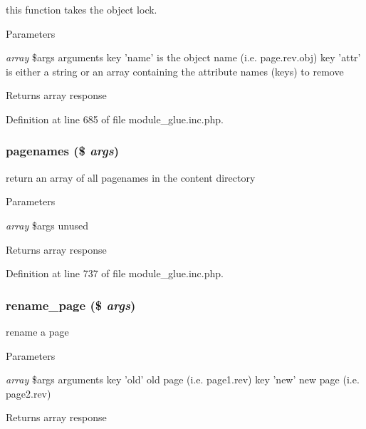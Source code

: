 this function takes the object lock. 
\begin{DoxyParams}{Parameters}
\item[{\em array}]\$args arguments key 'name' is the object name (i.e. page.rev.obj) key 'attr' is either a string or an array containing the attribute names (keys) to remove \end{DoxyParams}
\begin{DoxyReturn}{Returns}
array response 
\end{DoxyReturn}


Definition at line 685 of file module\_\-glue.inc.php.

\hypertarget{module__glue_8inc_8php_a354fc85f928484ae3b316bbf0065d9bd}{
\subsubsection[{pagenames}]{\setlength{\rightskip}{0pt plus 5cm}pagenames (\$ {\em args})}}
\label{module__glue_8inc_8php_a354fc85f928484ae3b316bbf0065d9bd}
return an array of all pagenames in the content directory


\begin{DoxyParams}{Parameters}
\item[{\em array}]\$args unused \end{DoxyParams}
\begin{DoxyReturn}{Returns}
array response 
\end{DoxyReturn}


Definition at line 737 of file module\_\-glue.inc.php.

\hypertarget{module__glue_8inc_8php_acd08b36587528b6f088cafb7d1d6bd29}{
\subsubsection[{rename\_\-page}]{\setlength{\rightskip}{0pt plus 5cm}rename\_\-page (\$ {\em args})}}
\label{module__glue_8inc_8php_acd08b36587528b6f088cafb7d1d6bd29}
rename a page 
\begin{DoxyParams}{Parameters}
\item[{\em array}]\$args arguments key 'old' old page (i.e. page1.rev) key 'new' new page (i.e. page2.rev) \end{DoxyParams}
\begin{DoxyReturn}{Returns}
array response 
\end{DoxyReturn}


